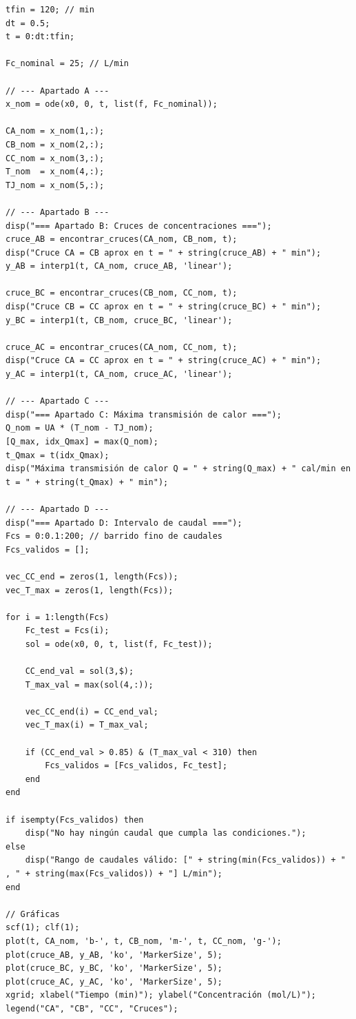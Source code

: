 \begin{verbatim}
tfin = 120; // min
dt = 0.5;
t = 0:dt:tfin;

Fc_nominal = 25; // L/min

// --- Apartado A ---
x_nom = ode(x0, 0, t, list(f, Fc_nominal));

CA_nom = x_nom(1,:);
CB_nom = x_nom(2,:);
CC_nom = x_nom(3,:);
T_nom  = x_nom(4,:);
TJ_nom = x_nom(5,:);

// --- Apartado B ---
disp("=== Apartado B: Cruces de concentraciones ===");
cruce_AB = encontrar_cruces(CA_nom, CB_nom, t);
disp("Cruce CA = CB aprox en t = " + string(cruce_AB) + " min");
y_AB = interp1(t, CA_nom, cruce_AB, 'linear');

cruce_BC = encontrar_cruces(CB_nom, CC_nom, t);
disp("Cruce CB = CC aprox en t = " + string(cruce_BC) + " min");
y_BC = interp1(t, CB_nom, cruce_BC, 'linear');

cruce_AC = encontrar_cruces(CA_nom, CC_nom, t);
disp("Cruce CA = CC aprox en t = " + string(cruce_AC) + " min");
y_AC = interp1(t, CA_nom, cruce_AC, 'linear');

// --- Apartado C ---
disp("=== Apartado C: Máxima transmisión de calor ===");
Q_nom = UA * (T_nom - TJ_nom);
[Q_max, idx_Qmax] = max(Q_nom);
t_Qmax = t(idx_Qmax);
disp("Máxima transmisión de calor Q = " + string(Q_max) + " cal/min en t = " + string(t_Qmax) + " min");

// --- Apartado D ---
disp("=== Apartado D: Intervalo de caudal ===");
Fcs = 0:0.1:200; // barrido fino de caudales
Fcs_validos = [];

vec_CC_end = zeros(1, length(Fcs));
vec_T_max = zeros(1, length(Fcs));

for i = 1:length(Fcs)
    Fc_test = Fcs(i);
    sol = ode(x0, 0, t, list(f, Fc_test));
    
    CC_end_val = sol(3,$);
    T_max_val = max(sol(4,:));
    
    vec_CC_end(i) = CC_end_val;
    vec_T_max(i) = T_max_val;
    
    if (CC_end_val > 0.85) & (T_max_val < 310) then
        Fcs_validos = [Fcs_validos, Fc_test];
    end
end

if isempty(Fcs_validos) then
    disp("No hay ningún caudal que cumpla las condiciones.");
else
    disp("Rango de caudales válido: [" + string(min(Fcs_validos)) + " , " + string(max(Fcs_validos)) + "] L/min");
end

// Gráficas
scf(1); clf(1);
plot(t, CA_nom, 'b-', t, CB_nom, 'm-', t, CC_nom, 'g-');
plot(cruce_AB, y_AB, 'ko', 'MarkerSize', 5);
plot(cruce_BC, y_BC, 'ko', 'MarkerSize', 5);
plot(cruce_AC, y_AC, 'ko', 'MarkerSize', 5);
xgrid; xlabel("Tiempo (min)"); ylabel("Concentración (mol/L)");
legend("CA", "CB", "CC", "Cruces");


\end{verbatim}
